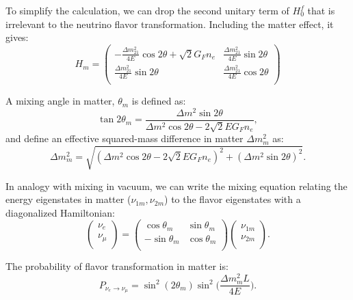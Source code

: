 To simplify the calculation, we can drop the second unitary term of $H^f_0$ that is irrelevant to the neutrino flavor transformation. Including the matter effect, it gives:
\begin{equation}\label{eq:Hm}
	H_m = \begin{pmatrix}
		-\frac{\Delta m_{21}^2}{4E}\cos 2\theta+\sqrt 2G_Fn_e & \frac{\Delta m_{21}^2}{4E}\sin 2\theta\\
		\frac{\Delta m_{21}^2}{4E}\sin 2\theta &\frac{\Delta m_{21}^2}{4E}\cos 2\theta\\
	\end{pmatrix}
\end{equation}

A mixing angle in matter, $\theta_m$ is defined as:
\begin{equation}\label{eq:thetaM}
	\tan 2\theta_m = \frac{\Delta m^2\sin2\theta}{\Delta m^2\cos2\theta-2\sqrt 2E G_Fn_e},
\end{equation}
and define an effective squared-mass difference in matter $\Delta m^2_m$ as:
\begin{equation}
	\Delta m^2_m = \sqrt{(\Delta m^2\cos2\theta - 2\sqrt 2EG_Fn_e)^2+(\Delta m^2\sin2\theta)^2}.
\end{equation}

In analogy with mixing in vacuum, we can write the mixing equation relating the energy eigenstates in matter ($\nu_{1m},\nu_{2m}$) to the flavor eigenstates with a diagonalized Hamiltonian:
\begin{equation}\label{eq:matter_mixing}
	\begin{pmatrix}
		\nu_e\\
		\nu_\mu\\
	\end{pmatrix}
	= \begin{pmatrix}
		\cos\theta_m & \sin\theta_m\\
		-\sin\theta_m & \cos\theta_m \\
	\end{pmatrix}
	\begin{pmatrix}
		\nu_{1m}\\
		\nu_{2m}\\
	\end{pmatrix}.
\end{equation}

The probability of flavor transformation in matter is:
\begin{equation}
	P_{\nu_e\to\nu_{\mu}}=\sin^2(2\theta_m)\sin^2\Big(\frac{\Delta m_m^2L}{4E}\Big).
\end{equation}

